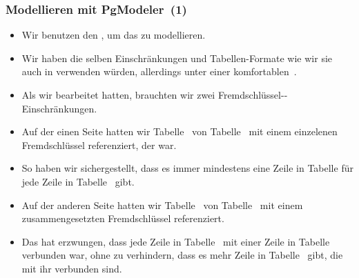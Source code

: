 \documentclass[aspectratio=169,mathserif,notheorems]{beamer}%
\begin{document}
\begin{frame}%
\frametitle{Modellieren mit PgModeler~(1)}%
\begin{itemize}%
%
\item Wir benutzen den \pgmodeler, um das zu modellieren.%
%
\item<2-> Wir haben die selben Einschränkungen und Tabellen-Formate wie wir sie auch in  verwenden würden, allerdings unter einer komfortablen~.%
%
\item<3-> Als wir  bearbeitet hatten, brauchten wir zwei Fremdschlüssel--Einschränkungen.%
%
\item<4-> Auf der einen Seite hatten wir Tabelle~ von Tabelle~ mit einem einzelenen Fremdschlüssel referenziert, der  war.%
%
\item<5-> So haben wir sichergestellt, dass es immer mindestens eine Zeile in Tabelle  für jede Zeile in Tabelle~ gibt.%
%
\item<6-> Auf der anderen Seite hatten wir Tabelle~ von Tabelle~ mit einem zusammengesetzten Fremdschlüssel referenziert.%
%
\item<7-> Das hat erzwungen, dass jede Zeile in Tabelle~ mit einer Zeile in Tabelle~ verbunden war, ohne zu verhindern, dass es mehr Zeile in Tabelle~ gibt, die mit ihr verbunden sind.%
%
\end{itemize}%
\end{frame}%
%
\end{document}
